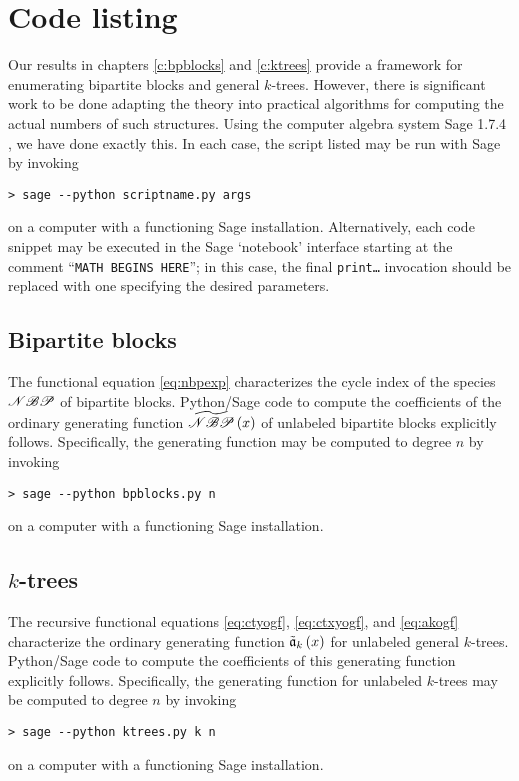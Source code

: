 \documentclass[distribution,draft]{brandiss} %
\numberwithin{section}{chapter}
\numberwithin{figure}{chapter}
\begin{document}
\chapter{Code listing}\label{c:code}
Our results in chapters \ref{c:bpblocks} and \ref{c:ktrees} provide a framework for enumerating bipartite blocks and general $k$-trees.
However, there is significant work to be done adapting the theory into practical algorithms for computing the actual numbers of such structures.
Using the computer algebra system Sage 1.7.4 \cite{sage}, we have done exactly this.
In each case, the script listed may be run with Sage by invoking
\begin{verbatim}
> sage --python scriptname.py args
\end{verbatim}
on a computer with a functioning Sage installation.
Alternatively, each code snippet may be executed in the Sage `notebook' interface starting at the comment ``\texttt{MATH BEGINS HERE}''; in this case, the final \texttt{print\dots} invocation should be replaced with one specifying the desired parameters.

\section{Bipartite blocks}\label{s:bpbcode}
The functional equation \eqref{eq:nbpexp} characterizes the cycle index of the species $\mathscr{NBP}$ of bipartite blocks.
Python/Sage code to compute the coefficients of the ordinary generating function $\widetilde{\mathscr{NBP}} \left( {x} \right)$ of unlabeled bipartite blocks explicitly follows.
Specifically, the generating function may be computed to degree $n$ by invoking
\begin{verbatim}
> sage --python bpblocks.py n
\end{verbatim}
on a computer with a functioning Sage installation.



\section{$k$-trees}\label{s:ktcode}
The recursive functional equations \eqref{eq:ctyogf}, \eqref{eq:ctxyogf}, and \eqref{eq:akogf} characterize the ordinary generating function $\tilde{\mathfrak{a}}_{k} \left( {x} \right)$ for unlabeled general $k$-trees.
Python/Sage code to compute the coefficients of this generating function explicitly follows.
Specifically, the generating function for unlabeled $k$-trees may be computed to degree $n$ by invoking
\begin{verbatim}
> sage --python ktrees.py k n
\end{verbatim}
on a computer with a functioning Sage installation.
\end{document}
